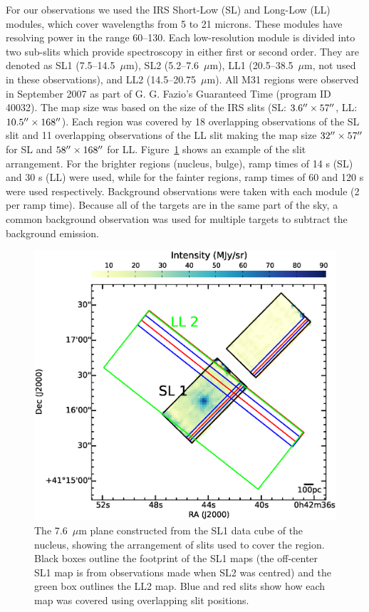 For our observations we used the IRS Short-Low (SL) and Long-Low (LL) modules, which cover wavelengths from 5 to 21 microns. 
These modules have resolving power in the range 60--130. Each low-resolution module is divided into two sub-slits 
which provide spectroscopy in either first or second order. They are denoted as SL1 (7.5--14.5~$\mu$m), SL2 (5.2--7.6~$\mu$m),
LL1 (20.5--38.5~$\mu$m, not used in these observations), and LL2 (14.5--20.75~$\mu$m).
All M31 regions were observed in September 2007 as part of G. G. Fazio's Guaranteed Time (program ID 40032). 
The map size was based on the size 
of the IRS slits (SL: $3.6\hbox{$^{\prime\prime}$} \times 57\hbox{$^{\prime\prime}$}$, LL: $10.5\hbox{$^{\prime\prime}$} \times 168\hbox{$^{\prime\prime}$}$). Each region was covered by 18 overlapping observations 
of the SL slit and 11 overlapping observations of the LL slit making the map size $32\hbox{$^{\prime\prime}$} \times 57\hbox{$^{\prime\prime}$}$ for SL and $58\hbox{$^{\prime\prime}$} \times 168\hbox{$^{\prime\prime}$}$ for LL. 
Figure~\ref{slits} shows an example of the slit arrangement. For the brighter regions (nucleus, bulge), ramp times of 14 s (SL) and 30 s (LL) were used, 
while for the fainter regions, ramp times of 60 and 120 s were used respectively. Background observations were taken with each module (2 per ramp time). 
Because all of the targets are in the same part of the sky, a common background observation was used for multiple targets to subtract the background emission. 

\begin{figure}
\centering
\includegraphics[scale=0.27]{./fig3.eps}
\caption{The 7.6~$\mu$m plane constructed from the SL1 data cube of the nucleus, showing the arrangement of slits used to cover the region. 
Black boxes outline the footprint of the SL1 maps (the off-center SL1 map is from observations made
when SL2 was centred) and the green box outlines the LL2 map. 
Blue and red slits show how  each map was covered using overlapping slit positions.
\label{slits}
}
\end{figure}

